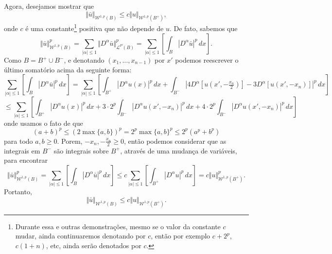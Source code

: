 \documentclass[a4paper, 11pt]{book}
\theoremstyle{definition}
\newcommand{\cL}{\mathcal{L}}
\newcommand{\cW}{\mathcal{W}}
\begin{document}
\begin{prf}
    Agora, desejamos mostrar que 
    \begin{equation} \label{eq:desigualdade-B-Bmais}
        \Vert \bar u \Vert_{\cW^{1,p}(B)} \leqslant c \Vert u \Vert_{\cW^{1,p}(B^+)},
    \end{equation}
    onde $c$ é uma constante\footnote{Durante essa e outras demonstrações, mesmo se o valor da constante $c$ mudar, ainda continuaremos denotando por $c$, então por exemplo $c + 2^p$, $c(1 + n)$, etc, ainda serão denotados por $c$.} positiva que não depende de $u$.
    De fato, sabemos que
    \[
        \Vert \bar u \Vert_{\cW^{1,p}(B)}^p = \sum_{|\alpha| \leqslant 1} \Vert D^\alpha\bar u \Vert_{\cL^P(B)}^p = \sum_{|\alpha| \leqslant 1} \left[\int_B |D^\alpha \bar u| ^p \,dx\right].
    \]
    Como $B = B^+ \cup B^-$, e denotando $(x_1,\dots,x_{n-1})$ por $x'$ podemos reescrever o último somatório acima da seguinte forma:
    \[
        \sum_{|\alpha| \leqslant 1} \left[\int_B |D^\alpha \bar u| ^p \,dx\right] = \sum_{|\alpha| \leqslant 1} \left[ \int_{B^+} |D^\alpha u(x)|^p \,dx + \int_{B^-} |4D^\alpha [u(x',-\tfrac{x_n}{2})] - 3D^\alpha [u(x',-x_n)] |^p \,dx \right]
    \]
    \[
        \leqslant \sum_{|\alpha| \leqslant 1} \left[ \int_{B^+} |D^\alpha u(x)|^p \,dx + 3 \cdot 2^p\int_{B^-} |D^\alpha u(x',-x_n)|^p \,dx + 4 \cdot 2^p\int_{B^-} |D^\alpha u(x',-x_n)|^p \,dx   \right] 
    \]
    onde usamos o fato de que
    \[
        (a + b)^p \leqslant (2 \max\{a,b\})^p = 2^p \max\{a,b\}^p \leqslant 2^p (a^p + b^p)
    \]
    para todo $a,b \geqslant 0$. Porem, $-x_n, -\tfrac{x_n}{2} \geqslant 0$, então podemos considerar que as integrais em $B^-$ são integrais sobre $B^+$, através de uma mudança de variáveis, para encontrar
    \[
        \Vert \bar u \Vert_{\cW^{1,p}(B)}^p = \sum_{|\alpha| \leqslant 1} \left[\int_B |D^\alpha \bar u| ^p \,dx\right] \leqslant c\sum_{|\alpha| \leqslant 1} \left[ \int_{B^+}|D^\alpha u|^p \,dx \right] = c \Vert u \Vert_{\cW^{1,p}(B^+)}^p.
    \]
    Portanto,
    \[
        \Vert \bar u \Vert_{\cW^{1,p}(B)} \leqslant c \Vert u \Vert_{\cW^{1,p}(B^+)}.
    \]


\end{prf}
\end{document}
